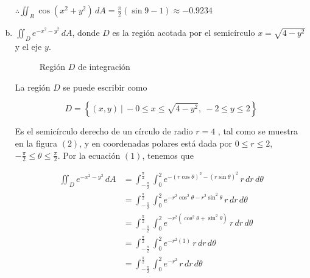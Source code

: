\documentclass[12pt]{exam}
\begin{document}
\begin{questions}
\begin{enumerate}[a)]
    $\therefore \iint_R \cos{(x^2+y^2)} \, dA = \frac{\pi}{2}(\sin{9}-1) \approx -0.9234$    

  \item $\iint_D e^{-x^2-y^2}\,dA$, donde $D$ es la región acotada por el semicírculo $x=\sqrt{4-y^2}$ y el eje $y$.

    \begin{figure}[H]
      \centering
      \label{fig:1_b}
      \caption{Región $D$ de integración}
    \end{figure}

    La región $D$ se puede escribir como

    \[
    D= \left\{(x,y)~|~-0 \leq x \leq \sqrt{4-y^2} ,~ -2 \leq y \leq 2 \right\}
    \]

    Es el semicírculo derecho de un círculo de radio $r=4$ , tal como se muestra en la figura $(2)$, y en coordenadas polares está dada por $0\leq r\leq 2$, $-\frac{\pi}{2}\leq \theta \leq \frac{\pi}{2}$. Por la ecuación $(1)$, tenemos que

    \begin{align*}
      \iint_D e^{-x^2-y^2}\,dA
      &= \int_{-\frac{\pi}{2}}^{\frac{\pi}{2}}\int_0^2
      e^{-(r\cos{\theta})^2-(r\sin{\theta})^2}\,r\,dr\,d\theta \\
      &= \int_{-\frac{\pi}{2}}^{\frac{\pi}{2}}\int_0^2
      e^{-r^2\cos^2{\theta}-r^2\sin^2{\theta}}\,r\,dr\,d\theta \\
      &= \int_{-\frac{\pi}{2}}^{\frac{\pi}{2}}\int_0^2
      e^{-r^2(\cos^2{\theta}+\sin^2{\theta})}\,r\,dr\,d\theta \\
      &= \int_{-\frac{\pi}{2}}^{\frac{\pi}{2}}\int_0^2
      e^{-r^2(1)}\,r\,dr\,d\theta \\
      &= \int_{-\frac{\pi}{2}}^{\frac{\pi}{2}}\int_0^2
      e^{-r^2}\,r\,dr\,d\theta
    \end{align*}


\end{enumerate}
\end{questions}
\end{document}
